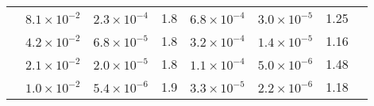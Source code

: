 \begin{table}[h!]
\begin{tabular}[1.1]{| c | c || c | c | c ||c | c | c || }
		\cline{2-7}
		& $8.1\times10^{-2}$ & $2.3\times10^{-4}$ & 1.8 & $6.8\times10^{-4}$ &$3.0\times10^{-5}$  & 1.25 \\ %
		\cline{2-7}
		& $4.2\times10^{-2}$ & $6.8\times10^{-5}$ & 1.8 & $3.2\times10^{-4}$ &$1.4\times10^{-5}$  & 1.16 \\ %
		\cline{2-7}
		& $2.1\times10^{-2}$ & $2.0\times10^{-5}$ & 1.8 & $1.1\times10^{-4}$ &$5.0\times10^{-6}$  & 1.48 \\ %
		\cline{2-7}
		& $1.0\times10^{-2}$ & $5.4\times10^{-6}$ & 1.9 & $3.3\times10^{-5}$ &$2.2\times10^{-6}$  & 1.18 \\ %
		\hline
	\end{tabular}
\end{table}


